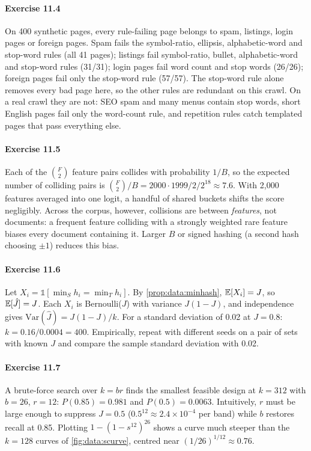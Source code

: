 \paragraph{Exercise 11.4} On 400 synthetic pages, every rule-failing page belongs to spam,
listings, login pages or foreign pages. Spam fails the symbol-ratio, ellipsis, alphabetic-word and
stop-word rules (all 41 pages); listings fail symbol-ratio, bullet, alphabetic-word and stop-word
rules (31/31); login pages fail word count and stop words (26/26); foreign pages fail only the
stop-word rule (57/57). The stop-word rule alone removes every bad page here, so the other
rules are redundant on this crawl. On a real crawl they are not: SEO spam and many menus contain
stop words, short English pages fail only the word-count rule, and repetition rules catch templated
pages that pass everything else.

\paragraph{Exercise 11.5} Each of the $\binom{F}{2}$ feature pairs collides with probability
$1/B$, so the expected number of colliding pairs is $\binom{F}{2}/B = 2000\cdot1999/2/2^{18}\approx 7.6$.
With 2{,}000 features averaged into one logit, a handful of shared buckets shifts the score
negligibly. Across the corpus, however, collisions are between \emph{features}, not documents: a
frequent feature colliding with a strongly weighted rare feature biases every document containing
it. Larger $B$ or signed hashing (a second hash choosing $\pm1$) reduces this bias.

\paragraph{Exercise 11.6} Let $X_i=\mathbb{1}[\min_S h_i = \min_T h_i]$. By
\cref{prop:data:minhash}, $\mathbb{E}[X_i]=J$, so $\mathbb{E}[\hat J]=J$. Each $X_i$ is Bernoulli($J$) with variance
$J(1-J)$, and independence gives $\mathrm{Var}(\hat J)=J(1-J)/k$. For a standard deviation of 0.02 at $J=0.8$:
$k = 0.16/0.0004 = 400$. Empirically, repeat  with different seeds
on a pair of sets with known $J$ and compare the sample standard deviation with 0.02.

\paragraph{Exercise 11.7} A brute-force search over $k=br$ finds the smallest feasible design at
$k=312$ with $b=26$, $r=12$: $P(0.85)=0.981$ and $P(0.5)=0.0063$. Intuitively, $r$ must be large
enough to suppress $J=0.5$ ($0.5^{12}\approx2.4\times10^{-4}$ per band) while $b$ restores recall at
0.85. Plotting $1-(1-s^{12})^{26}$ shows a curve much steeper than the $k=128$ curves of
\cref{fig:data:scurve}, centred near $(1/26)^{1/12}\approx0.76$.


